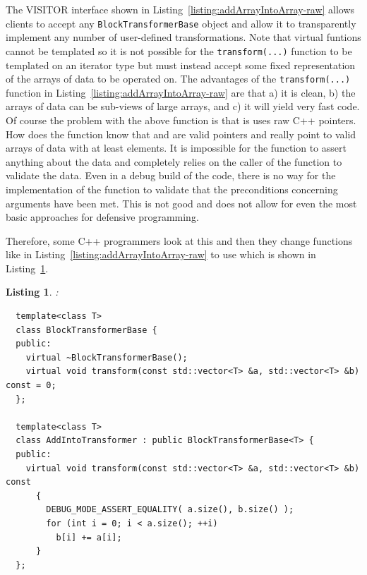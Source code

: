 \documentclass[pdf,ps2pdf,11pt]{SANDreport}
\newtheorem{listing}{Listing}
\begin{document}
The VISITOR interface shown in
Listing~\ref{listing:addArrayIntoArray-raw} allows clients to accept
any {}\texttt{BlockTransformerBase} object and allow it to
transparently implement any number of user-defined transformations.
Note that virtual funtions cannot be templated so it is not possible
for the {}\texttt{transform(...)} function to be templated on an
iterator type but must instead accept some fixed representation of the
arrays of data to be operated on.  The advantages of the
{}\texttt{transform(...)} function in
Listing~\ref{listing:addArrayIntoArray-raw} are that a) it is clean,
b) the arrays of data can be sub-views of large arrays, and c) it will
yield very fast code.  Of course the problem with the above function
{} is that is uses raw C++ pointers.  How does the
function {} know that {} and {} are
valid pointers and really point to valid arrays of data with at least
{} elements.  It is impossible for the function
{} to assert anything about the data and
completely relies on the caller of the function to validate the data.
Even in a debug build of the code, there is no way for the
implementation of the function {} to validate that
the preconditions concerning arguments have been met.  This is not
good and does not allow for even the most basic approaches for
defensive programming.

Therefore, some C++ programmers look at this and then they change
functions like {} in
Listing~\ref{listing:addArrayIntoArray-raw} to use {}
which is shown in Listing~\ref{listing:addArrayIntoArray-std-vector}.

\begin{listing}:\\
\label{listing:addArrayIntoArray-std-vector}
{\small\begin{verbatim}
  template<class T>
  class BlockTransformerBase {
  public:
    virtual ~BlockTransformerBase();
    virtual void transform(const std::vector<T> &a, std::vector<T> &b) const = 0;
  };

  template<class T>
  class AddIntoTransformer : public BlockTransformerBase<T> {
  public:
    virtual void transform(const std::vector<T> &a, std::vector<T> &b) const
      {
        DEBUG_MODE_ASSERT_EQUALITY( a.size(), b.size() );
        for (int i = 0; i < a.size(); ++i)
          b[i] += a[i];
      }
  };
\end{verbatim}}
\end{listing}
\end{document}
